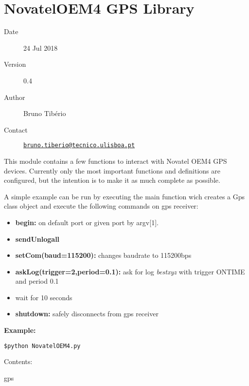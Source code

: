 
\chapter{NovatelOEM4 GPS Library}\label{welcome-to-novateloem4-gps-librarys-documentation}

\begin{description}
\item[Date]
24 Jul 2018
\item[Version]
0.4
\item[Author]
Bruno Tibério
\item[Contact]
\href{mailto:bruno.tiberio@tecnico.ulisboa.pt}{\nolinkurl{bruno.tiberio@tecnico.ulisboa.pt}}
\end{description}

This module contains a few functions to interact with Novatel OEM4 GPS
devices. Currently only the most important functions and definitions are
configured, but the intention is to make it as much complete as
possible.

A simple example can be run by executing the main function wich creates
a Gps class object and execute the following commands on gps receiver:

\begin{itemize}
\tightlist
\item
  \textbf{begin:} on default port or given port by argv{[}1{]}.
\item
  \textbf{sendUnlogall}
\item
  \textbf{setCom(baud=115200):} changes baudrate to 115200bps
\item
  \textbf{askLog(trigger=2,period=0.1):} ask for log \emph{bestxyz} with
  trigger {ONTIME} and period {0.1}
\item
  wait for 10 seconds
\item
  \textbf{shutdown:} safely disconnects from gps receiver
\end{itemize}

\textbf{Example:}

\begin{verbatim}
$python NovatelOEM4.py
\end{verbatim}

Contents:

gps